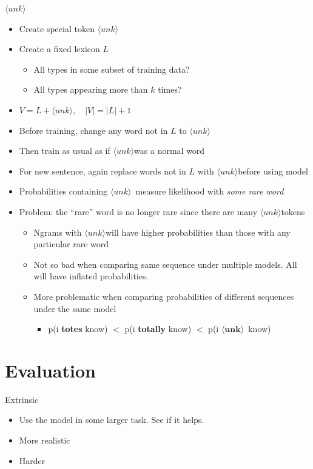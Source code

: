 \documentclass[11pt,letterpaper]{article}
\newcommand{\ngramunk}{\ensuremath{\langle unk \rangle}}
\begin{document}
\ngramunk

\begin{itemize}
  \item Create special token \ngramunk
  \item Create a fixed lexicon $L$
    \begin{itemize}
      \item All types in some subset of training data?
      \item All types appearing more than $k$ times?
    \end{itemize}
  \item $V = L + \ngramunk$, ~ $|V| = |L|+1$
  \item Before training, change any word not in $L$ to \ngramunk
  \item Then train as usual as if \ngramunk was a normal word
  \item For new sentence, again replace words not in $L$ with \ngramunk before using model
  \item Probabilities containing \ngramunk\ measure likelihood with \textit{some rare word}
  \item Problem: the ``rare'' word is no longer rare since there are many \ngramunk tokens
    \begin{itemize}
      \item Ngrams with \ngramunk will have higher probabilities than those with any particular rare word
      \item Not so bad when comparing same sequence under multiple models.  All will have inflated probabilities.
      \item More problematic when comparing probabilities of different sequences under the same model
        \begin{itemize}
          \item p(i \textbf{totes} know) $<$ p(i \textbf{totally} know) $<$ p(i $\mathbf{\langle unk \rangle}$\ know)
        \end{itemize}
    \end{itemize}
\end{itemize}




\section{Evaluation}

Extrinsic

\begin{itemize}
  \item Use the model in some larger task.  See if it helps.
  \item More realistic
  \item Harder
\end{itemize}
\end{document}
